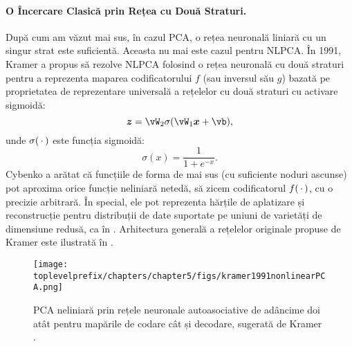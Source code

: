 \documentclass[../../book-main_ro.tex]{subfiles}
\begin{document}
\paragraph{O Încercare Clasică prin Rețea cu Două Straturi.} După cum am
văzut mai sus, în cazul PCA, o rețea neuronală liniară cu un singur
strat este suficientă. Aceasta nu mai este cazul pentru NLPCA. În 1991, Kramer
\cite{Kramer1991NonlinearPC} a propus să rezolve NLPCA folosind o rețea
neuronală cu două straturi pentru a reprezenta maparea codificatorului $f$ (sau inversul său $g$) bazată
pe proprietatea de reprezentare universală a rețelelor cu două straturi cu activare
sigmoidă:
\begin{equation}
  \z = \vW_2 \sigma(\vW_1\x +\vb),
\end{equation}
unde $\sigma(\,\cdot\,)$ este funcția sigmoidă:
\begin{equation}
  \sigma(x) = \frac{1}{1+ e^{-x}}.
\end{equation}
Cybenko \cite{Cybenko1989ApproximationBS} a arătat că funcțiile de
forma de mai sus (cu suficiente noduri ascunse) pot aproxima orice funcție
neliniară netedă, să zicem codificatorul $f(\,\cdot\,)$, cu o precizie
arbitrară. În special, ele pot reprezenta hărțile de aplatizare și reconstrucție
pentru distribuții de date suportate pe uniuni de varietăți de dimensiune redusă,
ca în . Arhitectura generală a
rețelelor originale propuse de Kramer este ilustrată în .
\begin{figure}[tb]
  \centering
  \texttt{[image: \\toplevelprefix/chapters/chapter5/figs/kramer1991nonlinearPCA.png]}
  \caption{PCA neliniară prin rețele neuronale autoasociative de adâncime
    doi atât pentru mapările de codare cât și decodare, sugerată de
  Kramer \cite{Kramer1991NonlinearPC}.}
  \label{fig:NLPCA}
\end{figure}
\end{document}
